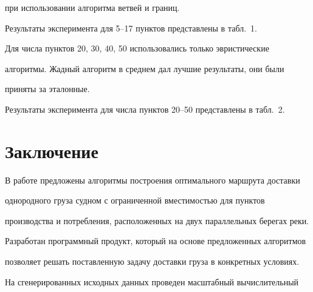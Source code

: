 при использовании алгоритма ветвей и границ.


  


  Результаты эксперимента для 5--17 пунктов представлены в табл.~1.


  





     


  Для числа пунктов 20, 30, 40, 50 использовались только эвристические 


алгоритмы. Жадный алгоритм в среднем дал лучшие результаты, они были 


приняты за эталонные.


  


  Результаты эксперимента для числа пунктов 20--50 представлены в табл.~2.


  








\vspace*{-4pt}


     


\section{Заключение}





\vspace*{-2pt}





  В работе предложены алгоритмы построения оптимального маршрута доставки 


однородного груза судном с ограниченной вместимостью для пунктов 


производства и потребления, расположенных на двух параллельных берегах реки. 


Разработан программный продукт, который на основе предложенных алгоритмов 


позволяет решать поставленную задачу доставки груза в конкретных условиях.


  


  На сгенерированных исходных данных проведен масштабный вычислительный 


